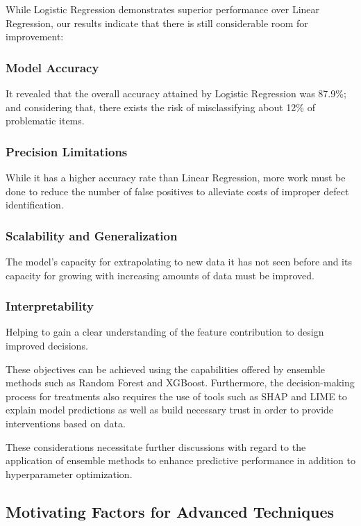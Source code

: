 \documentclass[conference]{IEEEtran}
\begin{document}
While Logistic Regression demonstrates superior performance over Linear Regression, our results indicate that there is still considerable room for improvement:

\subsubsection{Model Accuracy}
It revealed that the overall accuracy attained by Logistic Regression was 87.9\%; and considering that, there exists the risk of misclassifying about 12\% of problematic items.

\subsubsection{Precision Limitations}
While it has a higher accuracy rate than Linear Regression, more work must be done to reduce the number of false positives to alleviate costs of improper defect identification.

\subsubsection{Scalability and Generalization}
The model’s capacity for extrapolating to new data it has not seen before and its capacity for growing with increasing amounts of data must be improved.

\subsubsection{Interpretability}
Helping to gain a clear understanding of the feature contribution to design improved decisions.

These objectives can be achieved using the capabilities offered by ensemble methods such as Random Forest and XGBoost. Furthermore, the decision-making process for treatments also requires the use of tools such as SHAP and LIME to explain model predictions as well as build necessary trust in order to provide interventions based on data.

These considerations necessitate further discussions with regard to the application of ensemble methods to enhance predictive performance in addition to hyperparameter optimization.

\subsection{Motivating Factors for Advanced Techniques}
\end{document}
